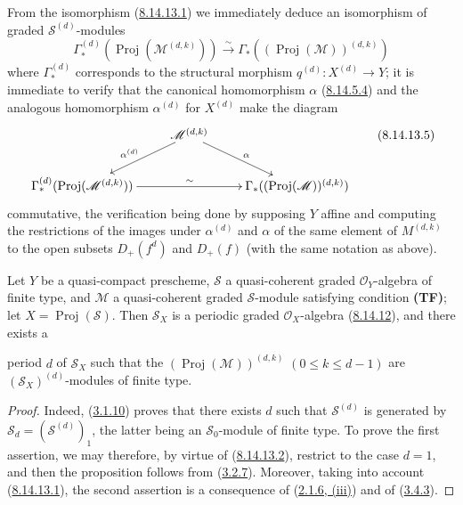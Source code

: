 \begin{remark}[8.14.13]
From the isomorphism (\hyperref[II.8.14.13.1]{8.14.13.1}) we immediately
deduce an isomorphism of graded $\mathcal{S}^{(d)}$-modules
\begin{equation}
\label{II.8.14.13.4}
  \Gamma_*^{(d)}(\operatorname{Proj}(\mathcal{M}^{(d,k)}))
  \xrightarrow{\sim}
  \Gamma_*((\operatorname{Proj}(\mathcal{M}))^{(d,k)})
\tag{8.14.13.4}
\end{equation}
where $\Gamma_*^{(d)}$ corresponds to the structural morphism
$q^{(d)}:X^{(d)}\to Y$; it is immediate to verify that the canonical
homomorphism $\alpha$ (\hyperref[II.8.14.5.4]{8.14.5.4}) and the
analogous homomorphism $\alpha^{(d)}$ for $X^{(d)}$ make the diagram
\begin{equation}
\label{II.8.14.13.5}
  \xymatrix{
    & \mathcal{M}^{(d,k)}\ar[dl]_{\alpha^{(d)}}\ar[dr]^{\alpha} & \\
    \Gamma_*^{(d)}(\operatorname{Proj}(\mathcal{M}^{(d,k)}))
      \ar[rr]^{\sim}
      && \Gamma_*((\operatorname{Proj}(\mathcal{M}))^{(d,k)})
  }
\tag{8.14.13.5}
\end{equation}
commutative, the verification being done by supposing $Y$ affine and
computing the restrictions of the images under $\alpha^{(d)}$ and $\alpha$ of
the same element of $M^{(d,k)}$ to the open subsets $D_+(f^d)$ and $D_+(f)$
(with the same notation as above).
\end{remark}

\begin{proposition}[8.14.14]
\label{II.8.14.14}
Let $Y$ be a quasi-compact prescheme, $\mathcal{S}$ a quasi-coherent graded
$\mathcal{O}_Y$-algebra of finite type, and $\mathcal{M}$ a quasi-coherent
graded $\mathcal{S}$-module satisfying condition
\textbf{(TF)}; let $X=\operatorname{Proj}(\mathcal{S})$. Then
$\mathcal{S}_X$ is a periodic graded $\mathcal{O}_X$-algebra
(\hyperref[II.8.14.12]{8.14.12}), and there exists a

period $d$ of $\mathcal{S}_X$ such that the
$(\operatorname{Proj}(\mathcal{M}))^{(d,k)}$
$(0\leqslant k\leqslant d-1)$ are
$(\mathcal{S}_X)^{(d)}$-modules of finite type.
\end{proposition}

\begin{proof}
Indeed, (\hyperref[II.3.1.10]{3.1.10}) proves that there exists $d$ such
that $\mathcal{S}^{(d)}$ is generated by
$\mathcal{S}_d=(\mathcal{S}^{(d)})_1$, the latter being an
$\mathcal{S}_0$-module of finite type. To prove the first assertion, we
may therefore, by virtue of (\hyperref[II.8.14.13.2]{8.14.13.2}), restrict
to the case $d=1$, and then the proposition follows from
(\hyperref[II.3.2.7]{3.2.7}). Moreover, taking into account
(\hyperref[II.8.14.13.1]{8.14.13.1}), the second assertion is a consequence
of (\hyperref[II.2.1.6]{2.1.6, (iii)}) and of
(\hyperref[II.3.4.3]{3.4.3}).
\end{proof}

